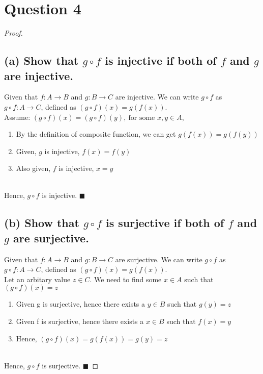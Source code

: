 \documentclass{article}
\begin{document}
\section*{Question 4}
\begin{proof}

    \subsection*{(a) Show that $g \circ f$ is injective if both of $f$ and $g$ are injective.}

    Given that $f : A \rightarrow B$ and $g : B \rightarrow C$ are injective. 
    We can write $g \circ f$ as $g \circ f: A \rightarrow C$, defined as $(g \circ f)(x) = g(f(x))$.
    \\
    Assume: $(g \circ f)(x) = (g \circ f)(y), \ \text{for some $x,y \in A$} $, 
    \begin{enumerate}
        \item By the definition of composite function, we can get $g(f(x)) = g(f(y))$
        \item Given, $g$ is injective, $f(x) = f(y)$
        \item Also given, $f$ is injective, $x = y$
    \end{enumerate}
    \\
    Hence, $g \circ f$ is injective. 
    $\blacksquare$

    \subsection*{(b) Show that $g \circ f$ is surjective if both of $f$ and $g$ are surjective.}

    Given that $f : A \rightarrow B$ and $g : B \rightarrow C$ are surjective. 
    We can write $g \circ f$ as $g \circ f: A \rightarrow C$, defined as $(g \circ f)(x) = g(f(x))$.
    \\
    Let an arbitary value $z \in C$. We need to find some $x \in A$ such that $(g \circ f)(x) = z$
    \begin{enumerate}
        \item Given g is surjective, hence there exists a $y \in B$ such that $g(y) = z$
        \item Given f is surjective, hence there exists a $x \in B$ such that $f(x) = y$
        \item Hence, $(g \circ f)(x) = g(f(x)) = g(y) = z$
    \end{enumerate}
    \\
    Hence, $g \circ f$ is surjective. 
    $\blacksquare$
\end{proof}
\end{document}
